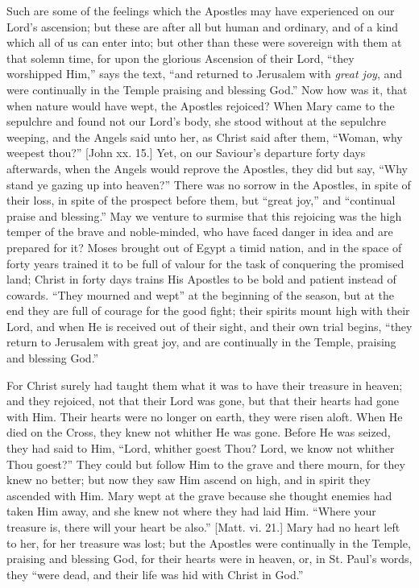 Such are some of the feelings which the Apostles may have
experienced on our Lord's ascension; but these are after all but human
and ordinary, and of a kind which all of us can enter into; but other
than these were sovereign with them at that solemn time, for upon the
glorious Ascension of their Lord, ``they worshipped Him,''
says the text, ``and returned to Jerusalem with \emph{great joy},
and were continually in the Temple praising and blessing God.''
Now how was it, that when nature would have wept, the Apostles
rejoiced? When Mary came to the sepulchre and found not our Lord's
body, she stood without at the sepulchre weeping, and the Angels said
unto her, as Christ said after them, ``Woman, why weepest
thou?'' [John xx. 15.] Yet, on our Saviour's departure forty days
afterwards, when the Angels would reprove the Apostles, they did but
say, ``Why stand ye gazing up into heaven?'' There was no
sorrow in the Apostles, in spite of their loss, in spite of the
prospect before them, but ``great joy,'' and ``continual
praise and blessing.'' May we venture to surmise that this
rejoicing was the high temper of the brave and noble-minded, who have
faced danger in idea and are prepared for it? Moses brought out of
Egypt a timid nation, and in the space of forty years trained it to be
full of valour for the task of conquering the promised land; Christ in
forty days trains His Apostles to be bold and patient instead of
cowards. ``They mourned and wept'' at the beginning of the
season, but at the end they are full of courage for the good fight;
their spirits mount high with their Lord, and when He is received out
of their sight, and their own trial begins, ``they return to
Jerusalem with great joy, and are continually in the Temple, praising
and blessing God.''

For Christ surely had taught them what it was to have their
treasure in heaven; and they rejoiced, not that their Lord was gone,
but that their hearts had gone with Him. Their hearts were no longer
on earth, they were risen aloft. When He died on the Cross, they knew
not whither He was gone. Before He was seized, they had said to Him,
``Lord, whither goest Thou? Lord, we know not whither Thou goest?''
They could but follow Him to the grave and there mourn, for they knew
no better; but now they saw Him ascend on high, and in spirit they
ascended with Him. Mary wept at the grave because she thought enemies
had taken Him away, and she knew not where they had laid Him.
``Where your treasure is, there will your heart be also.''
[Matt. vi. 21.] Mary had no heart left to her, for her treasure was
lost; but the Apostles were continually in the Temple, praising and
blessing God, for their hearts were in heaven, or, in St. Paul's
words, they ``were dead, and their life was hid with Christ in
God.''

